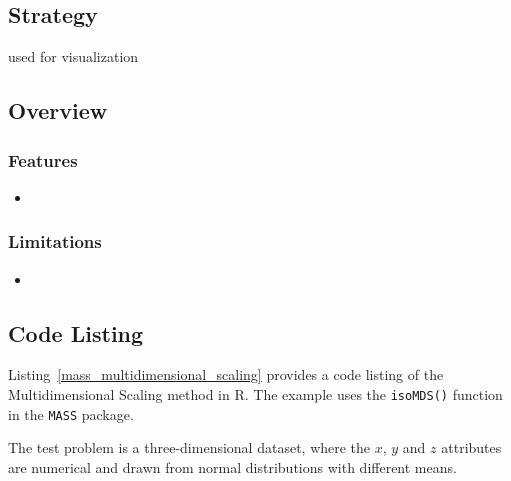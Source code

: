 \subsection{Strategy}

used for visualization


\subsection{Overview}

\subsubsection{Features}

\begin{itemize}
	\item 
\end{itemize}

\subsubsection{Limitations}

\begin{itemize}
	\item 
\end{itemize}


\subsection{Code Listing}
Listing~\ref{mass_multidimensional_scaling} provides a code listing of the Multidimensional Scaling method in R.
The example uses the \texttt{isoMDS()} function in the \texttt{MASS} package.

The test problem is a three-dimensional dataset, where the $x$, $y$ and $z$ attributes are numerical and drawn from normal distributions with different means. 




